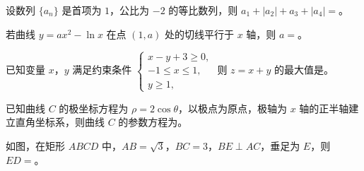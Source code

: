 \begin{question}
设数列 $\{a_n\}$ 是首项为 $1$，公比为 $-2$ 的等比数列，则 $a_1+|a_2|+a_3+|a_4|=$\gkblank{}。

\end{question}
\begin{question}
若曲线 $y=ax^2-\ln x$ 在点 $(1,a)$ 处的切线平行于 $x$ 轴，则 $a=$\gkblank{}。

\end{question}
\begin{question}
已知变量 $x$，$y$ 满足约束条件 $\begin{cases}x-y+3\geqslant0,\\-1\leqslant x\leqslant1,\\y\geqslant1,\end{cases}$ 则 $z=x+y$ 的最大值是\gkblank{}。

\end{question}
\begin{question}
已知曲线 $C$ 的极坐标方程为 $\rho=2\cos\theta$，以极点为原点，极轴为 $x$ 轴的正半轴建立直角坐标系，则曲线 $C$ 的参数方程为\gkblank{}。

\Needspace{0.4\textheight}
\end{question}
\begin{question}
如图，在矩形 $ABCD$ 中，$AB=\sqrt3$，$BC=3$，$BE\perp AC$，垂足为 $E$，则 $ED=$\gkblank{}。
\nopagebreak[4]
\begin{center}\end{center}
\nopagebreak[4]
\end{question}

